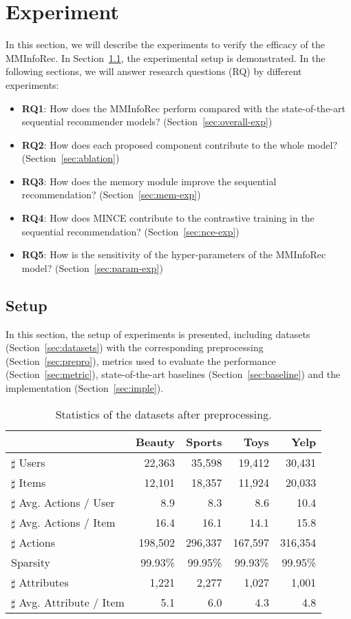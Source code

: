 \documentclass[conference]{IEEEtran}
\begin{document}
\section{Experiment}
\label{sec:exp}
In this section, we will describe the experiments to verify the efficacy of the MMInfoRec. In Section~\ref{sec:setup}, the experimental setup is demonstrated. In the following sections, we will answer research questions (RQ) by different experiments:

\begin{itemize}
    \item \textbf{RQ1}: How does the MMInfoRec perform compared with the state-of-the-art sequential recommender models? (Section~\ref{sec:overall-exp})
    \item \textbf{RQ2}: How does each proposed component contribute to the whole model? (Section~\ref{sec:ablation})
    \item \textbf{RQ3}: How does the memory module improve the sequential recommendation? (Section~\ref{sec:mem-exp})
    \item \textbf{RQ4}: How does MINCE contribute to the contrastive training in the sequential recommendation? (Section~\ref{sec:nce-exp})
    \item \textbf{RQ5}: How is the sensitivity of the hyper-parameters of the MMInfoRec model? (Section~\ref{sec:param-exp})
\end{itemize}

\subsection{Setup}
\label{sec:setup}
In this section, the setup of experiments is presented, including datasets (Section~\ref{sec:datasets}) with the corresponding preprocessing (Section~\ref{sec:prepro}), metrics used to evaluate the performance (Section~\ref{sec:metric}), state-of-the-art baselines (Section~\ref{sec:baseline}) and the implementation (Section~\ref{sec:imple}).

\begin{table}[t]
    \caption{Statistics of the datasets after preprocessing.}
    \begin{tabular}{l|rrrr}
    \toprule
    & Beauty & Sports & Toys & Yelp \\
    \midrule
    $\sharp$ Users & 22,363 & 35,598 & 19,412 & 30,431\\
    $\sharp$ Items & 12,101 & 18,357 & 11,924 & 20,033\\
    $\sharp$ Avg. Actions / User & 8.9 & 8.3 & 8.6 & 10.4\\
    $\sharp$ Avg. Actions / Item & 16.4 & 16.1 & 14.1 & 15.8\\
    $\sharp$ Actions & 198,502 & 296,337 & 167,597 & 316,354\\
    Sparsity & 99.93\% & 99.95\% & 99.93\% & 99.95\%\\
    $\sharp$ Attributes & 1,221 & 2,277 & 1,027 & 1,001\\
    $\sharp$ Avg. Attribute / Item & 5.1 & 6.0 & 4.3 & 4.8 \\
    \bottomrule
    \end{tabular}
    \label{tab:datasets}
\end{table}
\end{document}
